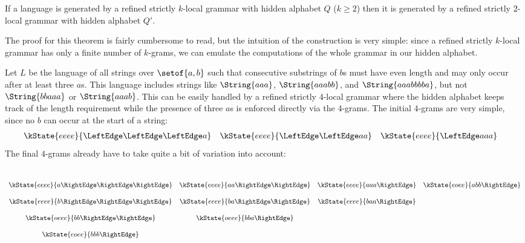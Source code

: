 \begin{theorem}
    If a language is generated by a refined strictly $k$-local grammar with hidden alphabet $Q$ ($k \geq 2$) then it is generated by a refined strictly $2$-local grammar with hidden alphabet $Q'$.
    \label{thm:REG_SL2}
\end{theorem}
%
The proof for this theorem is fairly cumbersome to read, but the intuition of the construction is very simple: since a refined strictly $k$-local grammar has only a finite number of $k$-grams, we can emulate the computations of the whole grammar in our hidden alphabet.
%
\begin{examplebox}
    Let $L$ be the language of all strings over $\setof{a,b}$ such that consecutive substrings of $b$s must have even length and may only occur after at least three $a$s. 
    \label{ex:REG_HiddenTranslation}
    This language includes strings like $\String{aaa}$, $\String{aaabb}$, and $\String{aaabbbba}$, but not $\String{bbaaa}$ or $\String{aaab}$.
    This can be easily handled by a refined strictly $4$-local grammar where the hidden alphabet keeps track of the length requirement while the presence of three $a$s is enforced directly via the $4$-grams.
    The initial $4$-grams are very simple, since no $b$ can occur at the start of a string:
    \[
        \begin{array}{cccc}
            \kState{eeee}{\LeftEdge \LeftEdge \LeftEdge a} &
            \kState{eeee}{\LeftEdge \LeftEdge a a} &
            \kState{eeee}{\LeftEdge a a a} &
        \end{array}
    \]
    The final $4$-grams already have to take quite a bit of variation into account:
    \[
        \begin{array}{cccc}
            \\[12pt]
            \kState{eeee}{a \RightEdge \RightEdge \RightEdge} &
            \kState{eeee}{a a \RightEdge \RightEdge} &
            \kState{eeee}{a a a\RightEdge} &
            \kState{eoee}{a b b\RightEdge}
            \\[12pt]
            \kState{eeee}{b \RightEdge \RightEdge \RightEdge} &
            \kState{eeee}{b a \RightEdge \RightEdge} &
            \kState{eeee}{b a a\RightEdge} &
            \\[12pt]
            \kState{oeee}{b b \RightEdge \RightEdge} &
            \kState{oeee}{b b a \RightEdge} &
            \\[12pt]
            \kState{eoee}{b b b \RightEdge}
        \end{array}
\]
\end{examplebox}
